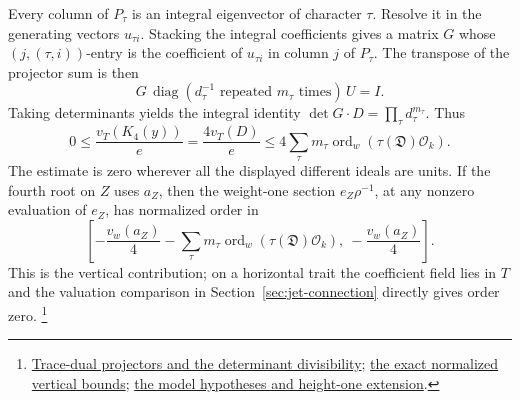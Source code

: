 Every column of \(P_\tau\) is an integral eigenvector of character
\(\tau\). Resolve it in the generating vectors \(u_{\tau i}\).
Stacking the integral coefficients gives a matrix \(G\) whose
\((j,(\tau,i))\)-entry is the coefficient of \(u_{\tau i}\) in
column \(j\) of \(P_\tau\). The transpose of the projector sum is
then
\[
  G\,\operatorname{diag}(d_\tau^{-1}
           \text{ repeated }m_\tau\text{ times})\,U=I .
\]
Taking determinants yields the integral identity
\(\det G\cdot D=\prod_\tau d_\tau^{m_\tau}\).
Thus
\[
  0\le \frac{v_T(K_4(y))}{e}
   =\frac{4v_T(D)}{e}
   \le 4\sum_\tau m_\tau
          \operatorname{ord}_w(\tau(\mathfrak D)\mathcal O_k).
\]
The estimate is zero wherever all the displayed different ideals
are units. If the fourth root on \(Z\) uses \(a_Z\), then the
weight-one section \(e_Z\rho^{-1}\), at any nonzero evaluation
of \(e_Z\), has normalized order in
\[
 \left[-\frac{v_w(a_Z)}4
       -\sum_\tau m_\tau\operatorname{ord}_w(\tau(\mathfrak D)\mathcal O_k),
       \ -\frac{v_w(a_Z)}4\right].
\]
This is the vertical contribution; on a horizontal trait the
coefficient field lies in \(T\) and the valuation comparison in
Section~\ref{sec:jet-connection} directly gives order zero.
\footnote{\href{https://github.com/ChristianKudeba/alpoge-rh-verification/blob/alpoge-source-7cbf7a0c/src/Development/AbelianVarietyTheory/Proofs/DivisorProofs/ColengthDvdOfNeZero.lean}{Trace-dual projectors and the determinant divisibility};
\href{https://github.com/ChristianKudeba/alpoge-rh-verification/blob/alpoge-source-7cbf7a0c/src/Development/AbelianVarietyTheory/Proofs/DivisorProofs/ThetaKeySectionValuationBoundsDifferent.lean}{the exact normalized vertical bounds};
\href{https://github.com/ChristianKudeba/alpoge-rh-verification/blob/alpoge-source-7cbf7a0c/src/Development/AbelianVarietyTheory/Proofs/DivisorProofs/ThetaKeyScalarIsUnitOnIntegralModels.lean}{the model hypotheses and height-one extension}.}
